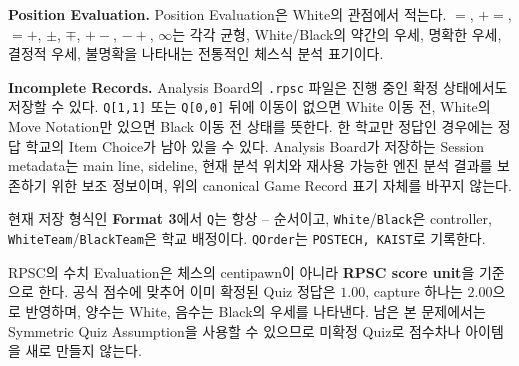 \medskip\noindent\textbf{Position Evaluation.}
Position Evaluation은 White의 관점에서 적는다. $=$, $+=$, $=+$, $\pm$, $\mp$, $+-$, $-+$, $\infty$는 각각 균형, White/Black의 약간의 우세, 명확한 우세, 결정적 우세, 불명확을 나타내는 전통적인 체스식 분석 표기이다.

\medskip\noindent\textbf{Incomplete Records.}
Analysis Board의 \texttt{.rpsc} 파일은 진행 중인 확정 상태에서도 저장할 수 있다. \texttt{Q[1,1]} 또는 \texttt{Q[0,0]} 뒤에 이동이 없으면 White 이동 전, White의 Move Notation만 있으면 Black 이동 전 상태를 뜻한다. 한 학교만 정답인 경우에는 정답 학교의 Item Choice가 남아 있을 수 있다. Analysis Board가 저장하는 Session metadata는 main line, sideline, 현재 분석 위치와 재사용 가능한 엔진 분석 결과를 보존하기 위한 보조 정보이며, 위의 canonical Game Record 표기 자체를 바꾸지 않는다.

현재 저장 형식인 \textbf{Format 3}에서 \texttt{Q}는 항상 \POSTECH--\KAIST{} 순서이고, \texttt{White}/\texttt{Black}은 controller, \texttt{WhiteTeam}/\texttt{BlackTeam}은 학교 배정이다. \texttt{QOrder}는 \texttt{POSTECH, KAIST}로 기록한다.

RPSC의 수치 Evaluation은 체스의 centipawn이 아니라 \textbf{RPSC score unit}을 기준으로 한다. 공식 점수에 맞추어 이미 확정된 Quiz 정답은 $1.00$, capture 하나는 $2.00$으로 반영하며, 양수는 White, 음수는 Black의 우세를 나타낸다. 남은 본 문제에서는 Symmetric Quiz Assumption을 사용할 수 있으므로 미확정 Quiz로 점수차나 아이템을 새로 만들지 않는다.
